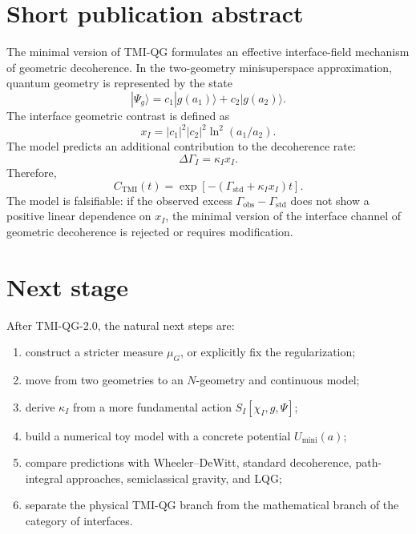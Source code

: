 \documentclass[12pt,a4paper]{article}
\newcommand{\std}{\mathrm{std}}
\newcommand{\obs}{\mathrm{obs}}
\begin{document}
\section{Short publication abstract}

The minimal version of TMI-QG formulates an effective interface-field mechanism of geometric decoherence. In the two-geometry minisuperspace approximation, quantum geometry is represented by the state
\[
|\Psi_g\rangle=c_1|g(a_1)\rangle+c_2|g(a_2)\rangle.
\]
The interface geometric contrast is defined as
\[
x_I=|c_1|^2|c_2|^2\ln^2(a_1/a_2).
\]
The model predicts an additional contribution to the decoherence rate:
\[
\Delta\Gamma_I=\kappa_I x_I.
\]
Therefore,
\[
C_{\mathrm{TMI}}(t)
=
\exp[-(\Gamma_{\std}+\kappa_I x_I)t].
\]
The model is falsifiable: if the observed excess \(\Gamma_{\obs}-\Gamma_{\std}\) does not show a positive linear dependence on \(x_I\), the minimal version of the interface channel of geometric decoherence is rejected or requires modification.

\section{Next stage}

After TMI-QG-2.0, the natural next steps are:
\begin{enumerate}[label=\arabic*.]
\item construct a stricter measure \(\mu_G\), or explicitly fix the regularization;
\item move from two geometries to an \(N\)-geometry and continuous model;
\item derive \(\kappa_I\) from a more fundamental action \(S_I[\chi_I,g,\Psi]\);
\item build a numerical toy model with a concrete potential \(U_{\mathrm{mini}}(a)\);
\item compare predictions with Wheeler--DeWitt, standard decoherence, path-integral approaches, semiclassical gravity, and LQG;
\item separate the physical TMI-QG branch from the mathematical branch of the category of interfaces.
\end{enumerate}
\end{document}

